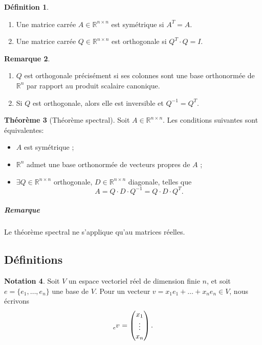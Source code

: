 \documentclass[11pt,a4paper]{article}
\theoremstyle{definition}
\newtheorem{mydef}{Définition}%
\newtheorem{mynota}[mydef]{Notation}
\newtheorem{myrem}[mydef]{Remarque}
\newtheorem{mytheo}[mydef]{Théorème}
\newcommand{\R}{\mathbb{R}}
\newcommand{\Rnn}{\R^{n \times n}}
\newcommand*\InsertTheoremBreak{%
	\begingroup %
		\setlength\itemsep{0pt}%
		\setlength\parsep{0pt}%
		\item[\vbox{\null}]%
	\endgroup%
}%
\begin{document}
\begin{mydef}\InsertTheoremBreak
	\begin{enumerate}
		\item Une matrice carrée $A \in \Rnn$ est symétrique si $A^T = A$.
		\item Une matrice carrée $Q \in \Rnn$ est orthogonale si $Q^T\cdot Q = I$.
	\end{enumerate}
\end{mydef}

\begin{myrem}\InsertTheoremBreak
	\begin{enumerate}
		\item $Q$ est orthogonale précisément si ses colonnes sont une base orthonormée de $\R^n$ par rapport au produit scalaire canonique.
		\item Si $Q$ est orthogonale, alors elle est inversible et $Q^{-1} = Q^T$.
	\end{enumerate}
\end{myrem}

\begin{mytheo}[Théorème spectral]
	Soit $A \in \Rnn$.
	Les conditions suivantes sont équivalentes:
	\begin{itemize}
		\item $A$ est symétrique ;
		\item $\R^n$ admet une base orthonormée de vecteurs propres de $A$ ;
		\item $\exists Q \in \Rnn$ orthogonale, $D \in \Rnn$ diagonale, telles que
			\[ A = Q \cdot D \cdot Q^{-1} = Q \cdot D \cdot Q^T. \]
	\end{itemize}
	\subparagraph{Remarque}
	Le théorème spectral ne s'applique qu'au matrices réelles.
\end{mytheo}

\subsection{Définitions}

\begin{mynota}
	Soit $V$ un espace vectoriel réel de dimension finie $n$,
	et soit $e = \{e_1, \dots, e_n\}$ une base de $V$.
	Pour un vecteur $v = x_1e_1 + \dots + x_ne_n \in V$, nous écrivons
	\[ \tensor[_e]{v}{} = \begin{pmatrix}x_1\\\vdots\\x_n\end{pmatrix}. \]
\end{mynota}
\end{document}
